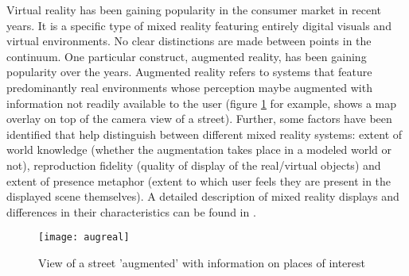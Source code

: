 Virtual reality has been gaining popularity in the consumer market in recent years. It is a specific type of mixed reality featuring entirely digital visuals and virtual environments. No clear distinctions are made between points in the continuum. One particular construct, augmented reality, has been gaining popularity over the years. Augmented reality refers to systems that feature predominantly real environments whose perception maybe augmented with information not readily available to the user (figure \ref{fig:augreal} for example, shows a map overlay on top of the camera view of a street). Further, some factors have been identified that help distinguish between different mixed reality systems: extent of world knowledge (whether the augmentation takes place in a modeled world or not), reproduction fidelity (quality of display of the real/virtual objects) and extent of presence metaphor (extent to which user feels they are present in the displayed scene themselves). A detailed description of mixed reality displays and differences in their characteristics can be found in \cite{milgram1995augmented}. 

\begin{figure}
	\centering
	\texttt{[image: augreal]}
	\caption{View of a street 'augmented' with information on places of interest}
	\label{fig:augreal}
\end{figure}
